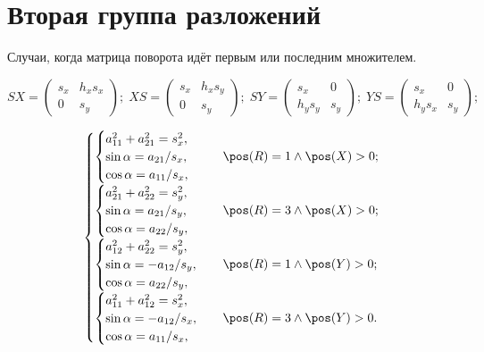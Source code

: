 \section{Вторая группа разложений}

Случаи, когда матрица поворота идёт первым или последним множителем.

$$
SX = \begin{pmatrix}s_x & h_xs_x \\ 0 & s_y\end{pmatrix};\;
XS = \begin{pmatrix}s_x & h_xs_y \\ 0 & s_y\end{pmatrix};\;
SY = \begin{pmatrix}s_x & 0 \\ h_ys_y & s_y\end{pmatrix};\;
YS = \begin{pmatrix}s_x & 0 \\ h_ys_x & s_y\end{pmatrix};
$$

$$
\begin{cases}
	\begin{cases}
		a_{11}^2 + a_{21}^2 = s_x^2, \\
		\sin\alpha = a_{21}/s_x,\\
		\cos\alpha = a_{11}/s_x,
	\end{cases} & \pos(R)=1 \wedge \pos(X)>0;\\
	\begin{cases}
		a_{21}^2 + a_{22}^2 = s_y^2, \\
		\sin\alpha = a_{21}/s_y,\\
		\cos\alpha = a_{22}/s_y,
	\end{cases} & \pos(R)=3 \wedge \pos(X)>0;\\
	\begin{cases}
		a_{12}^2 + a_{22}^2 = s_y^2,\\
		\sin\alpha = -a_{12}/s_y,\\
		\cos\alpha = a_{22}/s_y,
	\end{cases} & \pos(R)=1 \wedge \pos(Y)>0;\\
	\begin{cases}
		a_{11}^2 + a_{12}^2 = s_x^2,\\
		\sin\alpha = -a_{12}/s_x,\\
		\cos\alpha = a_{11}/s_x,
	\end{cases} & \pos(R)=3 \wedge \pos(Y)>0.\\
\end{cases}
$$

